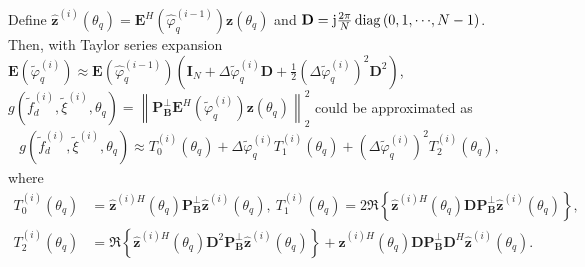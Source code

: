 \documentclass[12pt, draftclsnofoot, onecolumn]{IEEEtran}
\begin{document}
Define $\mathbf{\hat{z}}^{\left( i \right)}\left( {{\theta }_{q}} \right)={{\mathbf{E}}^{H}}\left( \hat{\varphi}_{q}^{\left( i-1 \right)} \right)\mathbf{z}\left( {{\theta }_{q}} \right)$ and $\mathbf{D}={\mathrm{j}}\frac{2{\rm \pi}}{N} \operatorname{diag}\left( 0, 1, \cdots\!, N-1 \right)$. Then, with Taylor series expansion $\mathbf{E}\left( {{\tilde{\varphi}}}^{\left( i\right)}_{q} \right) \approx \mathbf{E}\left( \hat{\varphi}_{q}^{\left( i-1 \right)} \right) \left( {{\mathbf{I}}_{N}}+ \Delta {{\tilde{\varphi}}}^{\left( i\right)}_{q} \mathbf{D}+\frac{1}{2}{{\left( \Delta {{\tilde{\varphi}}}^{\left( i\right)}_{q} \right)}^{2}}{{\mathbf{D}}^{2}} \right)$,
$g\left( {{{\tilde{f}}}_{d}^{(i)}}, {\tilde{\xi}}^{(i)}, {{\theta }_{q}} \right)= \left\| \mathbf{P}_{\mathbf{B}}^{\bot } {\mathbf{E}}^{H}\left( {{\tilde{\varphi}}}^{\left( i\right)}_{q} \right) \mathbf{z}\left( {{\theta }_{q}} \right) \right\|_{2}^{2}$ could be approximated as
\begin{align}
g\left( {{{\tilde{f}}}_{d}^{(i)}}, {\tilde{\xi}}^{(i)}, {{\theta }_{q}} \right)
  \approx {{T}_{0}^{\left( i \right)}}\left( {{\theta }_{q}} \right)+ \Delta \tilde{\varphi}_{q}^{\left( i \right)} {{T}_{1}^{\left( i \right)}}\left( {{\theta }_{q}} \right) +{{\left( \Delta \tilde{\varphi}_{q}^{\left( i \right)} \right)}^{2}}{{T}_{2}^{\left( i \right)}}\left( {{\theta }_{q}} \right),
\end{align}
where
\begin{align*}
{{T}_{0}^{\left( i \right)}}\left( {{\theta }_{q}} \right)&={{{\mathbf{\hat{z}}}}^{{\left( i \right)}H}}\left( {{\theta }_{q}} \right)\mathbf{P}_{\mathbf{B}}^{\bot }\mathbf{\hat{z}}^{\left( i \right)}\left( {{\theta }_{q}} \right), \
{{T}_{1}^{\left( i \right)}}\left( {{\theta }_{q}} \right) = 2\Re \left\{ {{{\mathbf{\hat{z}}}}^{{\left( i \right)}H}}\left( {{\theta }_{q}} \right)\mathbf{DP}_{\mathbf{B}}^{\bot }\mathbf{\hat{z}}^{\left( i \right)}\left( {{\theta }_{q}} \right) \right\}, \nonumber \\
{{T}_{2}^{\left( i \right)}}\left( {{\theta }_{q}} \right) &= \Re \left\{ {{{\mathbf{\hat{z}}}}^{{\left( i \right)}H}}\left( {{\theta }_{q}} \right) {{\mathbf{D}}^{2}}\mathbf{P}_{\mathbf{B}}^{\bot } \mathbf{\hat{z}}^{\left( i \right)}\left( {{\theta }_{q}} \right) \right\} + {{{\mathbf{\hat{z}}}}^{{\left( i \right)}H}}\left( {{\theta }_{q}} \right) \mathbf{DP}_{\mathbf{B}}^{\bot }{{\mathbf{D}}^{H}} \mathbf{\hat{z}}^{\left( i \right)}\left( {{\theta }_{q}} \right).
\end{align*}
\end{document}

